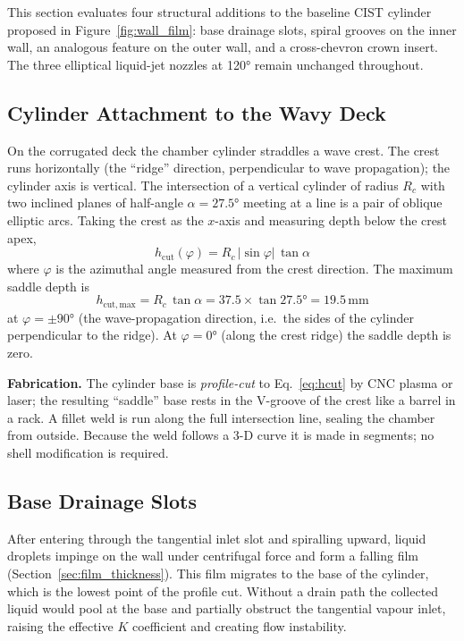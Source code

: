 \documentclass[11pt,letterpaper]{article}
\newcommand{\Rc}{R_c}
\begin{document}
This section evaluates four structural additions to the baseline CIST
cylinder proposed in Figure~\ref{fig:wall_film}: base drainage slots,
spiral grooves on the inner wall, an analogous feature on the outer
wall, and a cross-chevron crown insert.  The three elliptical
liquid-jet nozzles at 120° remain unchanged throughout.

\subsection{Cylinder Attachment to the Wavy Deck}

On the corrugated deck the chamber cylinder straddles a wave crest.
The crest runs horizontally (the ``ridge'' direction, perpendicular to
wave propagation); the cylinder axis is vertical.  The intersection of
a vertical cylinder of radius $\Rc$ with two inclined planes of
half-angle $\alpha = 27.5°$ meeting at a line is a pair of oblique
elliptic arcs.  Taking the crest as the $x$-axis and measuring depth
below the crest apex,
\begin{equation}
  h_{\mathrm{cut}}(\varphi) = \Rc\,|\sin\varphi|\,\tan\alpha
  \label{eq:hcut}
\end{equation}
where $\varphi$ is the azimuthal angle measured from the crest direction.
The maximum saddle depth is
\begin{equation}
  h_{\mathrm{cut,max}} = \Rc\,\tan\alpha = 37.5 \times \tan 27.5° = 19.5\,\text{mm}
  \label{eq:hcutmax}
\end{equation}
at $\varphi = \pm 90°$ (the wave-propagation direction, i.e.\ the sides of the
cylinder perpendicular to the ridge).  At $\varphi = 0°$ (along the crest
ridge) the saddle depth is zero.

\textbf{Fabrication.}  The cylinder base is \emph{profile-cut} to Eq.~\eqref{eq:hcut}
by CNC plasma or laser; the resulting ``saddle'' base rests in the V-groove
of the crest like a barrel in a rack.  A fillet weld is run along the full
intersection line, sealing the chamber from outside.  Because the weld follows
a 3-D curve it is made in segments; no shell modification is required.

\subsection{Base Drainage Slots}

After entering through the tangential inlet slot and spiralling upward, liquid
droplets impinge on the wall under centrifugal force and form a falling film
(Section~\ref{sec:film_thickness}).  This film migrates to the base of the
cylinder, which is the lowest point of the profile cut.  Without a drain path
the collected liquid would pool at the base and partially obstruct the
tangential vapour inlet, raising the effective $K$ coefficient and creating
flow instability.
\end{document}
